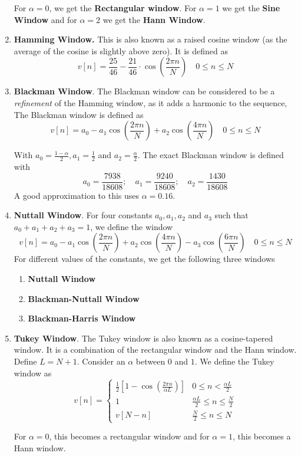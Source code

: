 \documentclass{article}
\theoremstyle{definition}
\newcommand\ddfrac[2]{\frac{\displaystyle #1}{\displaystyle #2}}
\begin{document}
\begin{enumerate}
    For $\alpha = 0$, we get the \textbf{Rectangular window}. For $\alpha = 1$ we get the \textbf{Sine Window} and for $\alpha = 2$ we get the \textbf{Hann Window}.
    
    \item \textbf{Hamming Window.} This is also known as a raised cosine window (as the average of the cosine is slightly above zero). It is defined as
    \[
        v[n] = \ddfrac{25}{46} - \ddfrac{21}{46} \cdot \cos \left( \ddfrac{2\pi n}{N} \right) \quad 0 \leq n \leq N 
    \]
    
    \item \textbf{Blackman Window}. The Blackman window can be considered to be a \textit{refinement} of the Hamming window, as it adds a harmonic to the sequence, The Blackman window is defined as
    \[
        v[n] = a_0 - a_1 \cos \left( \frac{2\pi n}{N} \right) + a_2 \cos \left( \frac{4\pi n}{N} \right) \quad 0 \leq n \leq N
    \]
    
    With $a_0 = \frac{1 - \alpha}{2}, a_1 = \frac{1}{2}$ and $a_2 = \frac{\alpha}{2}$. The exact Blackman window is defined with 
    \[
        a_0 = \frac{7938}{18608}; \quad a_1 = \frac{9240}{18608}; \quad a_2 = \frac{1430}{18608}
    \]
    A good approximation to this uses $\alpha = 0.16$.
    
    \item \textbf{Nuttall Window}. For four constants $a_0, a_1, a_2$ and $a_3$ such that $a_0 + a_1 + a_2 + a_3 = 1$, we define the window 
    \[
        v[n] = a_0 - a_1 \cos \left( \frac{2\pi n}{N} \right) + a_2 \cos \left( \frac{4\pi n}{N} \right) - a_3 \cos \left( \frac{6\pi n}{N} \right) \quad 0 \leq n \leq N
    \]
    For different values of the constants, we get the following three windows 
    \begin{enumerate}
        \item \textbf{Nuttall Window}
        \item \textbf{Blackman-Nuttall Window}
        \item \textbf{Blackman-Harris Window }
    \end{enumerate}
    
    \item \textbf{Tukey Window}. The Tukey window is also known as a cosine-tapered window. It is a combination of the rectangular window and the Hann window. Define $L = N+1$. Consider an $\alpha$ between $0$ and $1$. We define the Tukey window as 
    \[
        v[n] = 
        \begin{cases}
        \frac{1}{2} \left[ 1 - \cos \left( \frac{2\pi n}{\alpha L}\right) \right] & 0 \leq n < \frac{\alpha L}{2} \\
        1 & \frac{\alpha L}{2} \leq n \leq \frac{N}{2} \\
        v[N-n] & \frac{N}{2} \leq n \leq N
        \end{cases}
    \]
    
    For $\alpha =0$, this becomes a rectangular window and for $\alpha=1$, this becomes a Hann window.
\end{enumerate}
\end{document}

